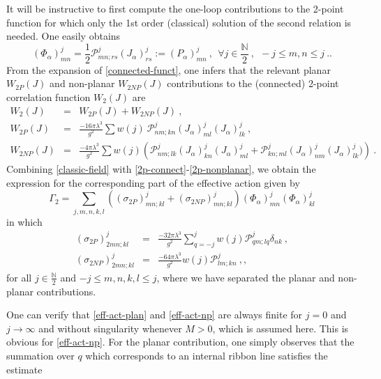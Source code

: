 \documentclass[a4paper,11pt,twoside]{article}
\numberwithin{equation}{section}
\theoremstyle{nonumberplain}
\newcounter{and}
\begin{document}
%
It will be instructive to first compute the one-loop contributions to the 2-point function for which only the 1st order (classical) solution of the second relation is needed. One easily obtains%
%
\begin{equation}
(\Phi_\alpha)^j_{mn} = \frac{1}{2} \mathcal{P}^j_{mn;rs}(J_\alpha)^j_{rs}
:= (P_\alpha)^j_{mn} \ , \ \ \forall j\in\frac{\mathbb{N}}{2} \ , \ \ -j\le m,n\le j \ . \label{classic-field}. 
\end{equation}
%
From the expansion of \eqref{connected-funct}, one infers that the relevant planar $W_{2P}(J)$ and non-planar $W_{2NP}(J)$ contributions to the (connected) 2-point correlation function $W_2(J)$ are%
%
\begin{eqnarray}
%
W_2(J) &=& W_{2P}(J) + W_{2NP}(J) \label{2p-connect} \ , \\
%
W_{2P}(J) &=& \frac{-16\pi\lambda^3}{g^2} \sum w(j) \ \mathcal{P}^j_{nm;kn} (J_\alpha)^j_{ml}(J_\alpha)^j_{lk} \ , \label{2p-planar} \\
%
W_{2NP}(J) &=& \frac{-4\pi\lambda^3}{g^2} \sum w(j) \left( \mathcal{P}^j_{nm;lk} (J_\alpha)^j_{kn}(J_\alpha)^j_{ml} + \mathcal{P}^j_{kn;ml}(J_\alpha)^j_{nm} (J_\alpha)^j_{lk}) \right) \ . \label{2p-nonplanar}
%
\end{eqnarray}
%
Combining \eqref{classic-field} with \eqref{2p-connect}-\eqref{2p-nonplanar}, we obtain the expression for the corresponding part of the effective action given by%
%
\begin{equation}
\Gamma_{2} = \sum_{j,m,n,k,l} \left((\sigma_{2P})^j_{mn;kl} + (\sigma_{2NP})^j_{mn;kl}\right)(\Phi_\alpha)^j_{mn} (\Phi_\alpha)^j_{kl}\label{effect-action-1loop}
\end{equation}
in which
\begin{eqnarray}
%
(\sigma_{2P})^j_{2mn;kl} &=& \frac{-32\pi\lambda^3}{g^2} \sum_{q=-j}^j w(j) \mathcal{P}^j_{qm;lq} \delta_{nk} \ , \label{eff-act-plan} \\
%
(\sigma_{2NP})^j_{2mn;kl} &=& \frac{-64\pi\lambda^3}{g^2} w(j) \mathcal{P}^j_{lm;kn} \ , \label{eff-act-np},
%
\end{eqnarray}
%
for all $j\in\frac{\mathbb{N}}{2}$ and $-j\le m,n,k,l\le j$, where we have separated the planar and non-planar contributions.\par%
%
One can verify that \eqref{eff-act-plan} and \eqref{eff-act-np} are always finite for $j=0$ and $j\to\infty$ and without singularity whenever $M>0$, which is assumed here. This is obvious for \eqref{eff-act-np}. For the planar contribution, one simply observes that the summation over $q$ which corresponds to an internal ribbon line satisfies the estimate%
\end{document}

